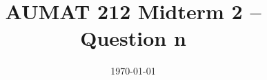 \documentclass[12pt,a4paper]{article}
\title{AUMAT 212 Midterm 2 -- Question n}
\date{\today}
\begin{document}
    \begin{problem}

    \end{problem}
    \begin{answer}
        
    \end{answer}
\end{document}
